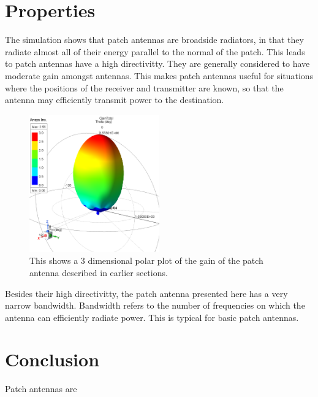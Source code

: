 \documentclass[12pt]{article}
\begin{document}
\section{Properties}

The simulation shows that patch antennas are broadside radiators, in that they radiate almost all of their energy parallel to the normal of the patch. This leads to patch antennas have a high directivitty. They are generally considered to have moderate gain amongst antennas\cite{khan2015microstrip}. This makes patch antennas useful for situations where the positions of the receiver and transmitter are known, so that the antenna may efficiently transmit power to the destination. 
\newpage
\begin{figure}[h]
    \centering
    \includegraphics[width=0.5\textwidth]{basic-patch-antenna-gain.png}
    \caption{This shows a 3 dimensional polar plot of the gain of the patch antenna described in earlier sections.}
\end{figure}

Besides their high directivitty, the patch antenna presented here has a very narrow bandwidth. Bandwidth refers to the number of frequencies on which the antenna can efficiently radiate power. This is typical for basic patch antennas\cite{balanis2016antenna}. 

\section{Conclusion}

Patch antennas are

\newpage


\end{document}
